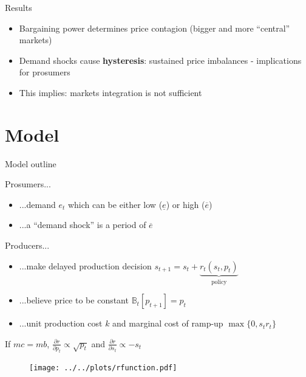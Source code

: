 \documentclass{beamer}
\newcommand{\B}{\mathbb{B}}
\begin{document}
\begin{frame}{Results}
    \begin{itemize} \setlength\itemsep{1.5em}
              \pause \item Bargaining power determines price contagion (bigger and more ``central'' markets)
              \pause \item Demand shocks cause \textbf{hysteresis}: sustained price imbalances - implications for prosumers
              \pause \item This implies: markets integration is not sufficient
    \end{itemize}
\end{frame}

\section{Model}

\begin{frame}{Model outline}
    \centering
    \resizebox{\textwidth}{!}{}
\end{frame}

\begin{frame}
    Prosumers...
    \begin{itemize} \setlength\itemsep{1.5em}
              \pause \item ...demand $e_t$ which can be either low ($\underline{e}$) or high ($\overline{e}$)
              \pause \item ...a ``demand shock'' is a period of $\overline{e}$
    \end{itemize}
\end{frame}


\begin{frame}

    Producers...
    \begin{itemize} \setlength\itemsep{1.5em}
              \pause \item ...make delayed production decision $s_{t+1} = s_t + \underbrace{r_t(s_t, p_t)}_{\text{policy}}$
              \pause \item ...believe price to be constant $\B_t[p_{t+1}] = p_t$
              \pause \item ...unit production cost $k$ and marginal cost of ramp-up $\max\{0, s_t r_t\}$
    \end{itemize}

\end{frame}

\begin{frame}
    If $mc = mb$, $\frac{\partial r}{\partial p_t} \propto \sqrt{p_t}$ and $\frac{\partial r}{\partial s_t} \propto - s_t$

    \begin{figure}
        \texttt{[image: ../../plots/rfunction.pdf]}
    \end{figure}
\end{frame}
\end{document}

